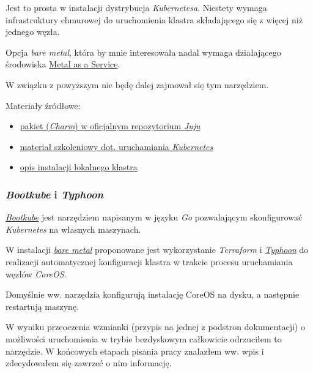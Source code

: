 \documentclass[a4paper,12pt,twoside,openany]{report}
\providecommand{\tightlist}{%
  \setlength{\itemsep}{0pt}\setlength{\parskip}{0pt}}
\begin{document}
Jest to prosta w instalacji dystrybucja \emph{Kubernetesa}. Niestety
wymaga infrastruktury chmurowej do uruchomienia klastra składającego się
z więcej niż jednego węzła.

Opcja \emph{bare metal}, która by mnie interesowała nadal wymaga
działającego środowiska \href{https://maas.io/}{Metal as a Service}.

W związku z powyższym nie będę dalej zajmował się tym narzędziem.

Materiały źródłowe:

\begin{itemize}
\tightlist
\item
  \href{https://jujucharms.com/canonical-kubernetes/}{pakiet
  (\emph{Charm}) w oficjalnym repozytorium \emph{Juju}}
\item
  \href{https://tutorials.ubuntu.com/tutorial/install-kubernetes-with-conjure-up}{materiał
  szkoleniowy dot. uruchamiania \emph{Kubernetes}}
\item
  \href{https://insights.ubuntu.com/2017/10/12/kubernetes-the-not-so-easy-way/}{opis
  instalacji lokalnego klastra}
\end{itemize}

\hypertarget{bootkube-i-typhoon}{%
\subsubsection{\texorpdfstring{\emph{Bootkube} i
\emph{Typhoon}}{Bootkube i Typhoon}}\label{bootkube-i-typhoon}}

\href{https://github.com/kubernetes-incubator/bootkube}{\emph{Bootkube}}
jest narzędziem napisanym w języku \emph{Go} pozwalającym skonfigurować
\emph{Kubernetes} na własnych maszynach.

W instalacji
\href{https://github.com/coreos/matchbox/tree/master/examples/terraform/bootkube-install}{\emph{bare
metal}} proponowane jest wykorzystanie \emph{Terraform} i
\href{https://github.com/poseidon/typhoon}{\emph{Typhoon}} do realizacji
automatycznej konfiguracji klastra w trakcie procesu uruchamiania węzłów
\emph{CoreOS}.

Domyślnie ww. narzędzia konfigurują instalację CoreOS na dysku, a
następnie restartują maszynę.

W wyniku przeoczenia wzmianki (przypis na jednej z podstron
dokumentacji) o możliwości uruchomienia w trybie bezdyskowym całkowicie
odrzuciłem to narzędzie. W końcowych etapach pisania pracy znalazłem ww.
wpis i zdecydowałem się zawrzeć o nim informację.
\end{document}
